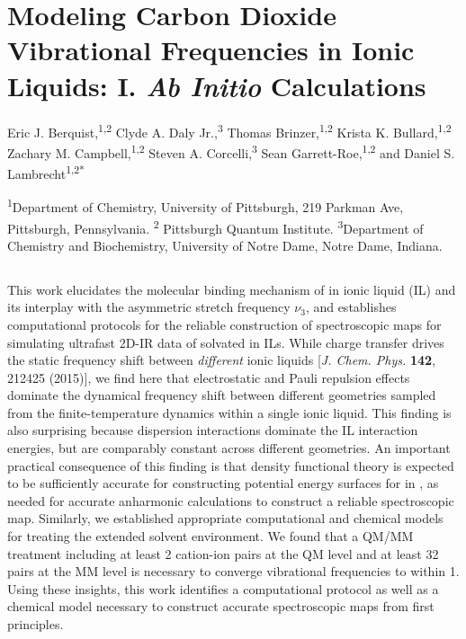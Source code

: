 \chapter{Modeling Carbon Dioxide Vibrational Frequencies in Ionic Liquids: I. \textit{Ab Initio} Calculations}
\label{ch:paper_02}

Eric J. Berquist,\textsuperscript{1,2} Clyde A. Daly Jr.,\textsuperscript{3} Thomas Brinzer,\textsuperscript{1,2} Krista K. Bullard,\textsuperscript{1,2} Zachary M. Campbell,\textsuperscript{1,2} Steven A. Corcelli,\textsuperscript{3} Sean Garrett-Roe,\textsuperscript{1,2} and Daniel S. Lambrecht\textsuperscript{1,2*}

\textsuperscript{1}Department of Chemistry, University of Pittsburgh, 219 Parkman Ave, Pittsburgh, Pennsylvania. \textsuperscript{2} Pittsburgh Quantum Institute. \textsuperscript{3}Department of Chemistry and Biochemistry, University of Notre Dame, Notre Dame, Indiana.

\section{}
\label{paper_02:sec:summary}

This work elucidates the molecular binding mechanism of  in \ce{[C4C1im][PF6]} ionic liquid (IL) and its interplay with the  asymmetric stretch frequency \(\nu_{3}\), and establishes computational protocols for the reliable construction of spectroscopic maps for simulating ultrafast 2D-IR data of  solvated in ILs. While charge transfer drives the static frequency shift between \emph{different} ionic liquids {[}\emph{J. Chem. Phys.}  \textbf{142}, 212425 (2015){]}, we find here that electrostatic and Pauli repulsion effects dominate the dynamical frequency shift between different geometries sampled from the finite-temperature dynamics within a single ionic liquid. This finding is also surprising because dispersion interactions dominate the \textendash{}IL interaction energies, but are comparably constant across different geometries. An important practical consequence of this finding is that density functional theory is expected to be sufficiently accurate for constructing potential energy surfaces for  in \ce{[C4C1im][PF6]}, as needed for accurate anharmonic calculations to construct a reliable spectroscopic map. Similarly, we established appropriate computational and chemical models for treating the extended solvent environment. We found that a QM/MM treatment including at least \num{2} cation-ion pairs at the QM level and at least \num{32} pairs at the MM level is necessary to converge vibrational frequencies to within \SI{1}{\wavenumber}. Using these insights, this work identifies a computational protocol as well as a chemical model necessary to construct accurate spectroscopic maps from first principles.

